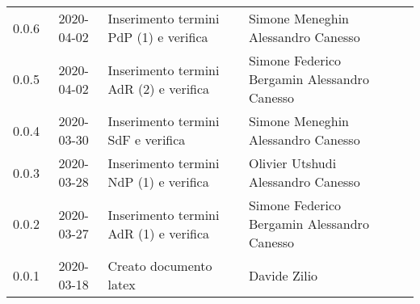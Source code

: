 {\begin{longtable}{ c c  C{4cm} C{3cm} C{3.5cm} }
		0.0.6 & 2020-04-02 & Inserimento termini PdP (1) e verifica & Simone Meneghin \newline Alessandro Canesso &\ana{} \newline \ver{} \\
		0.0.5 & 2020-04-02 & Inserimento termini AdR (2) e verifica & Simone Federico Bergamin \newline Alessandro Canesso &\ana{} \newline \ver{} \\
		0.0.4 & 2020-03-30 & Inserimento termini SdF e verifica & Simone Meneghin \newline Alessandro Canesso &\ana{} \newline \ver{} \\
		0.0.3 & 2020-03-28 & Inserimento termini NdP (1) e verifica & Olivier Utshudi \newline Alessandro Canesso &\ana{} \newline \ver{} \\
		0.0.2 & 2020-03-27 & Inserimento termini AdR (1) e verifica & Simone Federico Bergamin \newline Alessandro Canesso &\ana{} \newline \ver{} \\
		0.0.1 & 2020-03-18 & Creato documento latex & Davide Zilio &\ana{}\\		
		
	\end{longtable}

}